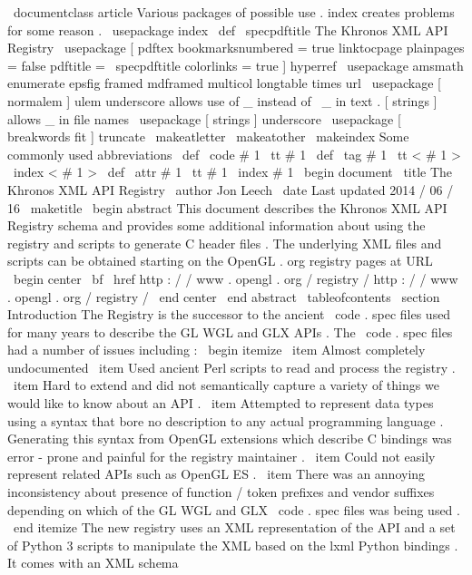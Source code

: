\
documentclass
{
article
}
%
Various
packages
of
possible
use
.
{
index
}
creates
problems
for
some
reason
.
%
\
usepackage
{
index
}
\
def
\
specpdftitle
{
The
Khronos
XML
API
Registry
}
\
usepackage
[
pdftex
bookmarksnumbered
=
true
linktocpage
plainpages
=
false
pdftitle
=
{
\
specpdftitle
}
colorlinks
=
true
]
{
hyperref
}
\
usepackage
{
amsmath
enumerate
epsfig
framed
mdframed
multicol
longtable
times
url
}
\
usepackage
[
normalem
]
{
ulem
}
%
underscore
allows
use
of
_
instead
of
\
_
in
text
.
[
strings
]
allows
_
in
file
names
\
usepackage
[
strings
]
{
underscore
}
\
usepackage
[
breakwords
fit
]
{
truncate
}
\
makeatletter
\
makeatother
\
makeindex
%
Some
commonly
used
abbreviations
\
def
\
code
#
1
{
{
\
tt
#
1
}
}
\
def
\
tag
#
1
{
{
\
tt
<
#
1
>
\
index
{
<
#
1
>
}
}
}
\
def
\
attr
#
1
{
{
\
tt
#
1
\
index
{
#
1
}
}
}
\
begin
{
document
}
\
title
{
The
Khronos
XML
API
Registry
}
\
author
{
Jon
Leech
}
\
date
{
Last
updated
2014
/
06
/
16
}
\
maketitle
\
begin
{
abstract
}
This
document
describes
the
Khronos
XML
API
Registry
schema
and
provides
some
additional
information
about
using
the
registry
and
scripts
to
generate
C
header
files
.
The
underlying
XML
files
and
scripts
can
be
obtained
starting
on
the
OpenGL
.
org
registry
pages
at
URL
\
begin
{
center
}
{
\
bf
\
href
{
http
:
/
/
www
.
opengl
.
org
/
registry
/
}
{
http
:
/
/
www
.
opengl
.
org
/
registry
/
}
}
\
end
{
center
}
\
end
{
abstract
}
\
tableofcontents
\
section
{
Introduction
}
The
Registry
is
the
successor
to
the
ancient
\
code
{
.
spec
}
files
used
for
many
years
to
describe
the
GL
WGL
and
GLX
APIs
.
The
\
code
{
.
spec
}
files
had
a
number
of
issues
including
:
\
begin
{
itemize
}
\
item
Almost
completely
undocumented
\
item
Used
ancient
Perl
scripts
to
read
and
process
the
registry
.
\
item
Hard
to
extend
and
did
not
semantically
capture
a
variety
of
things
we
would
like
to
know
about
an
API
.
\
item
Attempted
to
represent
data
types
using
a
syntax
that
bore
no
description
to
any
actual
programming
language
.
Generating
this
syntax
from
OpenGL
extensions
which
describe
C
bindings
was
error
-
prone
and
painful
for
the
registry
maintainer
.
\
item
Could
not
easily
represent
related
APIs
such
as
OpenGL
ES
.
\
item
There
was
an
annoying
inconsistency
about
presence
of
function
/
token
prefixes
and
vendor
suffixes
depending
on
which
of
the
GL
WGL
and
GLX
\
code
{
.
spec
}
files
was
being
used
.
\
end
{
itemize
}
The
new
registry
uses
an
XML
representation
of
the
API
and
a
set
of
Python
3
scripts
to
manipulate
the
XML
based
on
the
lxml
Python
bindings
.
It
comes
with
an
XML
schema
